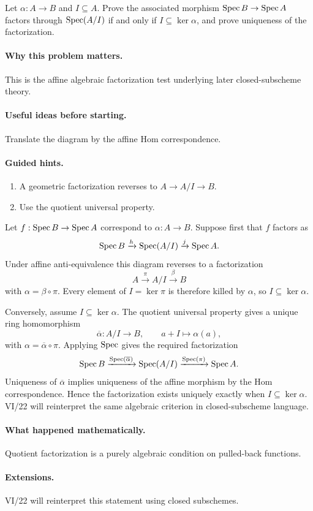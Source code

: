 \begin{problem}\label{prob:vi19-p15}
Let $\alpha:A\to B$ and $I\subseteq A$. Prove the associated morphism $\operatorname{Spec} B\to\operatorname{Spec} A$ factors through $\operatorname{Spec}(A/I)$ if and only if $I\subseteq\ker\alpha$, and prove uniqueness of the factorization.
\end{problem}

\ifdefined\FullProblemDossiers
\paragraph{Why this problem matters.}
This is the affine algebraic factorization test underlying later closed-subscheme theory.

\paragraph{Useful ideas before starting.}
Translate the diagram by the affine Hom correspondence.

\paragraph{Guided hints.}
\begin{enumerate}
\item A geometric factorization reverses to $A\to A/I\to B$.
\item Use the quotient universal property.
\end{enumerate}

\begin{solution}
Let \(f:\operatorname{Spec} B\to\operatorname{Spec} A\) correspond to \(\alpha:A\to B\).  Suppose first that \(f\) factors as
\[
\operatorname{Spec} B\xrightarrow{h}\operatorname{Spec}(A/I)\xrightarrow{j}\operatorname{Spec} A.
\]
Under affine anti-equivalence this diagram reverses to a factorization
\[
A\xrightarrow{\pi}A/I\xrightarrow{\beta}B
\]
with \(\alpha=\beta\circ\pi\).  Every element of \(I=\ker\pi\) is therefore killed by \(\alpha\), so \(I\subseteq\ker\alpha\).

Conversely, assume \(I\subseteq\ker\alpha\).  The quotient universal property gives a unique ring homomorphism
\[
\overline\alpha:A/I\to B,
\qquad a+I\longmapsto\alpha(a),
\]
with \(\alpha=\overline\alpha\circ\pi\).  Applying \(\operatorname{Spec}\) gives the required factorization
\[
\operatorname{Spec} B\xrightarrow{\operatorname{Spec}(\overline\alpha)}\operatorname{Spec}(A/I)
\xrightarrow{\operatorname{Spec}(\pi)}\operatorname{Spec} A.
\]
Uniqueness of \(\overline\alpha\) implies uniqueness of the affine morphism by the Hom correspondence.  Hence the factorization exists uniquely exactly when \(I\subseteq\ker\alpha\).  VI/22 will reinterpret the same algebraic criterion in closed-subscheme language.
\end{solution}

\paragraph{What happened mathematically.}
Quotient factorization is a purely algebraic condition on pulled-back functions.

\paragraph{Extensions.}
VI/22 will reinterpret this statement using closed subschemes.
\fi

